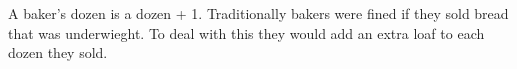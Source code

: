 \par
 A baker's dozen is a dozen + 1. Traditionally bakers were fined if they sold bread that was underwieght.  To deal with this they would add an extra loaf to each dozen they sold.